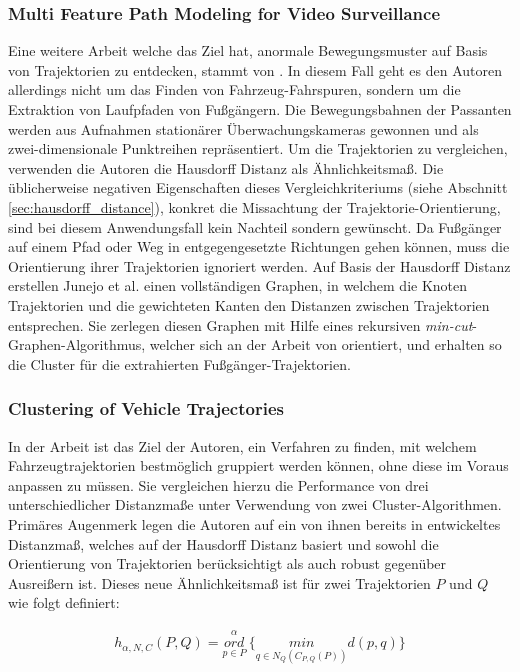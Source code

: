 \subsubsection*{Multi Feature Path Modeling for Video Surveillance}
Eine weitere Arbeit welche das Ziel hat, anormale Bewegungsmuster auf Basis von Trajektorien zu entdecken,
stammt von \cite[]{Junejo2004}. In diesem Fall geht es den Autoren allerdings nicht um das Finden von Fahrzeug-Fahrspuren,
sondern um die Extraktion von Laufpfaden von Fußgängern.
Die Bewegungsbahnen der Passanten werden aus Aufnahmen stationärer Überwachungskameras gewonnen und
als zwei-dimensionale Punktreihen repräsentiert.
Um die Trajektorien zu vergleichen, verwenden die Autoren die Hausdorff Distanz als Ähnlichkeitsmaß. 
Die üblicherweise negativen Eigenschaften dieses
Vergleichkriteriums (siehe Abschnitt \ref{sec:hausdorff_distance}), konkret die Missachtung der
Trajektorie-Orientierung, sind bei diesem Anwendungsfall kein Nachteil sondern gewünscht.
Da Fußgänger auf einem Pfad oder Weg in entgegengesetzte Richtungen gehen können, muss die Orientierung
ihrer Trajektorien ignoriert werden.
Auf Basis der Hausdorff Distanz erstellen Junejo et al. einen vollständigen Graphen, in welchem die Knoten Trajektorien
und die gewichteten Kanten den Distanzen zwischen Trajektorien entsprechen.
Sie zerlegen diesen Graphen mit Hilfe eines rekursiven \textit{min-cut}-Graphen-Algorithmus, welcher sich
an der Arbeit von \cite[]{boykov2004experimental} orientiert, und erhalten so die Cluster für die
extrahierten Fußgänger-Trajektorien.

\subsubsection*{Clustering of Vehicle Trajectories}
In der Arbeit \cite[]{Atev2010} ist das Ziel der Autoren, ein Verfahren zu finden, mit welchem Fahrzeugtrajektorien
bestmöglich gruppiert werden können, ohne diese im Voraus anpassen zu müssen.
Sie vergleichen hierzu die Performance von drei unterschiedlicher Distanzmaße unter Verwendung von zwei Cluster-Algorithmen.
Primäres Augenmerk legen die Autoren auf ein von ihnen bereits in \cite[]{Atev2006} entwickeltes Distanzmaß, 
welches auf der Hausdorff Distanz basiert und sowohl die Orientierung von Trajektorien berücksichtigt
als auch robust gegenüber Ausreißern ist. Dieses neue Ähnlichkeitsmaß ist für zwei Trajektorien $P$ und $Q$
wie folgt definiert:

\begin{ceqn}
\begin{align}
    h_{\alpha, N, C}(P, Q) = \overset{\alpha}{\underset{p \in P}{ord}}\ \Big\{ \underset{q \in N_Q(C_{P,Q}(P))}{min} d(p, q) \Big\}
\end{align}
\end{ceqn}

